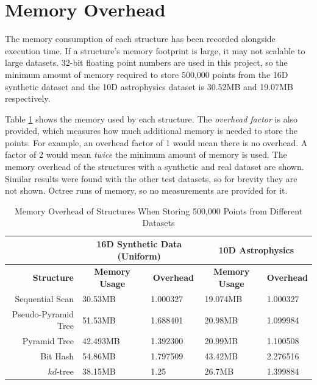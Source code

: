 \section{Memory Overhead}

The memory consumption of each structure has been recorded alongside execution time. If a structure's memory footprint is large, it may not scalable to large datasets. 32-bit floating point numbers are used in this project, so the minimum amount of memory required to store 500,000 points from the 16D synthetic dataset and the 10D astrophysics dataset is 30.52MB and 19.07MB respectively.

Table \ref{tab:memory-overhead} shows the memory used by each structure. The \textit{overhead factor} is also provided, which measures how much additional memory is needed to store the points. For example, an overhead factor of 1 would mean there is no overhead. A factor of 2 would mean \textit{twice} the minimum amount of memory is used. The memory overhead of the structures with a synthetic and real dataset are shown. Similar results were found with the other test datasets, so for brevity they are not shown. Octree runs of memory, so no measurements are provided for it.

\begin{table}
	\centering
	\begin{tabular}{|r|l|l|l|l|}
		\hline
		& \multicolumn{2}{|c|}{\textbf{16D Synthetic Data (Uniform)}} & \multicolumn{2}{|c|}{\textbf{10D Astrophysics}} \\ 
		\hline
		\textbf{Structure} & \multicolumn{1}{|c|}{\textbf{Memory Usage}} & \multicolumn{1}{|c|}{\textbf{Overhead}} & \multicolumn{1}{|c|}{\textbf{Memory Usage}} & \multicolumn{1}{|c|}{\textbf{Overhead}} \\
		\hline
		Sequential Scan & 30.53MB & 1.000327 & 19.074MB & 1.000327 \\
		Pseudo-Pyramid Tree & 51.53MB & 1.688401 & 20.98MB & 1.099984 \\
		Pyramid Tree & 42.493MB & 1.392300 & 20.99MB & 1.100508 \\
		Bit Hash & 54.86MB & 1.797509 & 43.42MB & 2.276516 \\
		$kd$-tree & 38.15MB & 1.25 & 26.7MB & 1.399884 \\
		\hline
	\end{tabular}
	\caption{Memory Overhead of Structures When Storing 500,000 Points from Different Datasets}
	\label{tab:memory-overhead}
\end{table}

